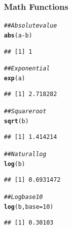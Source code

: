 \documentclass{beamer}\usepackage[]{graphicx}\usepackage[]{color}
\makeatletter
\newcommand{\hlnum}[1]{\textcolor[rgb]{0.686,0.059,0.569}{#1}}%
\newcommand{\hlcom}[1]{\textcolor[rgb]{0.678,0.584,0.686}{\textit{#1}}}%
\newcommand{\hlopt}[1]{\textcolor[rgb]{0,0,0}{#1}}%
\newcommand{\hlstd}[1]{\textcolor[rgb]{0.345,0.345,0.345}{#1}}%
\newcommand{\hlkwc}[1]{\textcolor[rgb]{0.333,0.667,0.333}{#1}}%
\newcommand{\hlkwd}[1]{\textcolor[rgb]{0.737,0.353,0.396}{\textbf{#1}}}%
\newenvironment{kframe}{%
 \def\at@end@of@kframe{}%
 \ifinner\ifhmode%
  \def\at@end@of@kframe{\end{minipage}}%
  \begin{minipage}{\columnwidth}%
 \fi\fi%
 \def\FrameCommand##1{\hskip\@totalleftmargin \hskip-\fboxsep
 \colorbox{shadecolor}{##1}\hskip-\fboxsep
     \hskip-\linewidth \hskip-\@totalleftmargin \hskip\columnwidth}%
 \MakeFramed {\advance\hsize-\width
   \@totalleftmargin\z@ \linewidth\hsize
   \@setminipage}}%
 {\par\unskip\endMakeFramed%
 \at@end@of@kframe}
\newenvironment{knitrout}{}{} %
\makeatother
\begin{document}
\begin{frame}[fragile]\frametitle{Math Functions}
\begin{knitrout}\footnotesize
{}\color{fgcolor}\begin{kframe}
\begin{alltt}
\hlcom{## Absolute value}
\hlkwd{abs}\hlstd{(a} \hlopt{-} \hlstd{b)}
\end{alltt}
\begin{verbatim}
## [1] 1
\end{verbatim}
\begin{alltt}
\hlcom{## Exponential}
\hlkwd{exp}\hlstd{(a)}
\end{alltt}
\begin{verbatim}
## [1] 2.718282
\end{verbatim}
\begin{alltt}
\hlcom{## Square root}
\hlkwd{sqrt}\hlstd{(b)}
\end{alltt}
\begin{verbatim}
## [1] 1.414214
\end{verbatim}
\begin{alltt}
\hlcom{## Natural log}
\hlkwd{log}\hlstd{(b)}
\end{alltt}
\begin{verbatim}
## [1] 0.6931472
\end{verbatim}
\begin{alltt}
\hlcom{## Log base 10}
\hlkwd{log}\hlstd{(b,} \hlkwc{base} \hlstd{=} \hlnum{10}\hlstd{)}
\end{alltt}
\begin{verbatim}
## [1] 0.30103
\end{verbatim}
\end{kframe}
\end{knitrout}
\end{frame}
\end{document}
